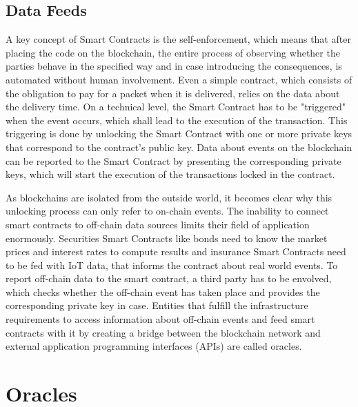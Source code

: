 \documentclass[conference]{IEEEtran}
\begin{document}
\subsection{Data Feeds}
A key concept of Smart Contracts is the self-enforcement, which means that after placing the code on the blockchain, the entire process of observing whether the parties behave in the specified way and in case introducing the consequences, is automated without human involvement. Even a simple contract, which consists of the obligation to pay for a packet when it is delivered, relies on the data about the delivery time. On a technical level, the Smart Contract has to be "triggered" when the event occurs, which shall lead to the execution of the transaction. This triggering is done by unlocking the Smart Contract with one or more private keys that correspond to the contract's public key. Data about events on the blockchain can be reported to the Smart Contract by presenting the corresponding private keys, which will start the execution of the transactions locked in the contract. \cite{Mik2017} \par
As blockchains are isolated from the outside world, it becomes clear why this unlocking process can only refer to on-chain events. The inability to connect smart contracts to off-chain data sources limits their field of application enormously. Securities Smart Contracts like bonds need to know the market prices and interest rates to compute results and insurance Smart Contracts need to be fed with IoT data, that informs the contract about real world events. To report off-chain data to the smart contract, a third party has to be envolved, which checks whether the off-chain event has taken place and provides the corresponding private key in case. Entities that fulfill the infrastructure requirements to access information about off-chain events and feed smart contracts with it by creating a bridge between the blockchain network and external application programming interfaces (APIs) are called oracles. \cite{Mik2017} \cite{Ellis2017} \cite{Thomas2014} \par  
 
\section{Oracles}
\end{document}
